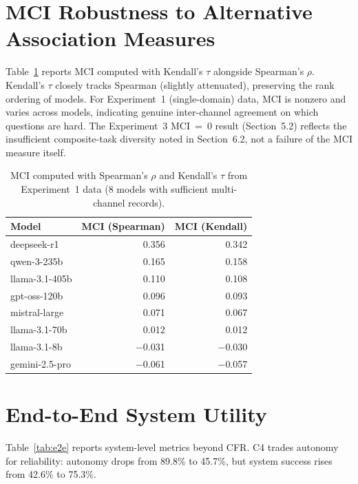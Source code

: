 \documentclass[10pt]{article}
\begin{document}
\section{MCI Robustness to Alternative Association Measures}
\label{app:mci-robust}

Table~\ref{tab:mci-robustness} reports MCI computed with Kendall's $\tau$ alongside Spearman's $\rho$. Kendall's $\tau$ closely tracks Spearman (slightly attenuated), preserving the rank ordering of models. For Experiment~1 (single-domain) data, MCI is nonzero and varies across models, indicating genuine inter-channel agreement on which questions are hard. The Experiment~3 MCI~=~0 result (Section~5.2) reflects the insufficient composite-task diversity noted in Section~6.2, not a failure of the MCI measure itself.

\begin{table}[h]
\centering
\caption{MCI computed with Spearman's $\rho$ and Kendall's $\tau$ from Experiment~1 data (8 models with sufficient multi-channel records).}
\label{tab:mci-robustness}
\small
\begin{tabular}{lrr}
\toprule
Model & MCI (Spearman) & MCI (Kendall) \\
\midrule
deepseek-r1 & 0.356 & 0.342 \\
qwen-3-235b & 0.165 & 0.158 \\
llama-3.1-405b & 0.110 & 0.108 \\
gpt-oss-120b & 0.096 & 0.093 \\
mistral-large & 0.071 & 0.067 \\
llama-3.1-70b & 0.012 & 0.012 \\
llama-3.1-8b & $-$0.031 & $-$0.030 \\
gemini-2.5-pro & $-$0.061 & $-$0.057 \\
\bottomrule
\end{tabular}
\end{table}

\section{End-to-End System Utility}
\label{app:e2e}

Table~\ref{tab:e2e} reports system-level metrics beyond CFR. C4 trades autonomy for reliability: autonomy drops from 89.8\% to 45.7\%, but system success rises from 42.6\% to 75.3\%.
\end{document}
